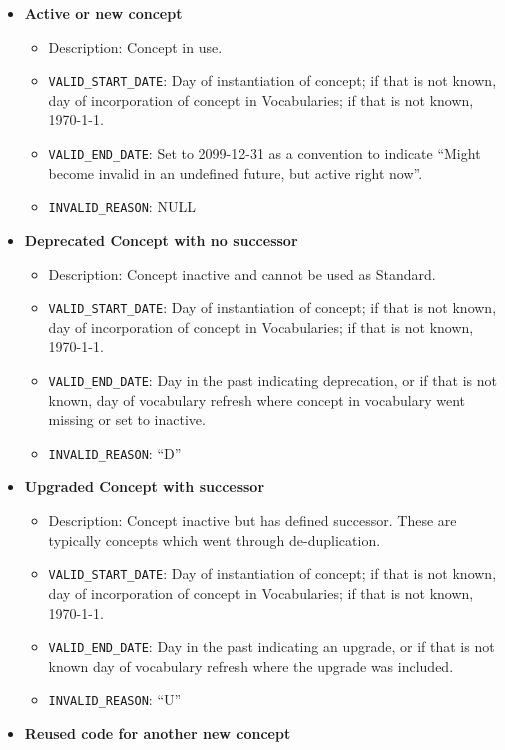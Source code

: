 \documentclass[
  letterpaper,
  paper=7in:10in,
  pagesize=pdftex,
  headinclude=on,
  footinclude=on,
  12pt]{scrbook}
\begin{document}
\begin{itemize}
\item
  \textbf{Active or new concept}

  \begin{itemize}
  \item
    Description: Concept in use.
  \item
    \texttt{VALID\_START\_DATE}: Day of instantiation of concept; if
    that is not known, day of incorporation of concept in Vocabularies;
    if that is not known, 1970-1-1.
  \item
    \texttt{VALID\_END\_DATE}: Set to 2099-12-31 as a convention to
    indicate ``Might become invalid in an undefined future, but active
    right now''.
  \item
    \texttt{INVALID\_REASON}: NULL
  \end{itemize}
\item
  \textbf{Deprecated Concept with no successor}

  \begin{itemize}
  \item
    Description: Concept inactive and cannot be used as Standard.
  \item
    \texttt{VALID\_START\_DATE}: Day of instantiation of concept; if
    that is not known, day of incorporation of concept in Vocabularies;
    if that is not known, 1970-1-1.
  \item
    \texttt{VALID\_END\_DATE}: Day in the past indicating deprecation,
    or if that is not known, day of vocabulary refresh where concept in
    vocabulary went missing or set to inactive.
  \item
    \texttt{INVALID\_REASON}: ``D''
  \end{itemize}
\item
  \textbf{Upgraded Concept with successor}

  \begin{itemize}
  \item
    Description: Concept inactive but has defined successor. These are
    typically concepts which went through de-duplication.
  \item
    \texttt{VALID\_START\_DATE}: Day of instantiation of concept; if
    that is not known, day of incorporation of concept in Vocabularies;
    if that is not known, 1970-1-1.
  \item
    \texttt{VALID\_END\_DATE}: Day in the past indicating an upgrade, or
    if that is not known day of vocabulary refresh where the upgrade was
    included.
  \item
    \texttt{INVALID\_REASON}: ``U''
  \end{itemize}
\item
  \textbf{Reused code for another new concept}


\end{itemize}
\end{document}
